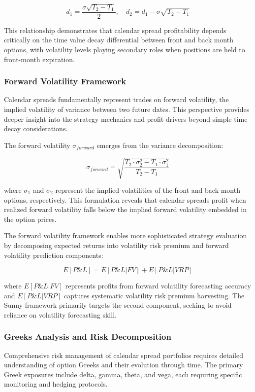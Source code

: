 \documentclass[
  american,
  11pt,
  11pt,
  letterpaper,
  onecolumn]{article}
\begin{document}
\[d_1 = \frac{\sigma\sqrt{T_2 - T_1}}{2}, \quad d_2 = d_1 - \sigma\sqrt{T_2 - T_1}\]

This relationship demonstrates that calendar spread profitability
depends critically on the time value decay differential between front
and back month options, with volatility levels playing secondary roles
when positions are held to front-month expiration.

\subsubsection{Forward Volatility
Framework}\label{forward-volatility-framework}

Calendar spreads fundamentally represent trades on forward volatility,
the implied volatility of variance between two future dates. This
perspective provides deeper insight into the strategy mechanics and
profit drivers beyond simple time decay considerations.

The forward volatility \(\sigma_{forward}\) emerges from the variance
decomposition:

\[\sigma_{forward} = \sqrt{\frac{T_2 \cdot \sigma_2^2 - T_1 \cdot \sigma_1^2}{T_2 - T_1}}\]

where \(\sigma_1\) and \(\sigma_2\) represent the implied volatilities
of the front and back month options, respectively. This formulation
reveals that calendar spreads profit when realized forward volatility
falls below the implied forward volatility embedded in the option
prices.

The forward volatility framework enables more sophisticated strategy
evaluation by decomposing expected returns into volatility risk premium
and forward volatility prediction components:

\[E[P\&L] = E[P\&L|FV] + E[P\&L|VRP]\]

where \(E[P\&L|FV]\) represents profits from forward volatility
forecasting accuracy and \(E[P\&L|VRP]\) captures systematic volatility
risk premium harvesting. The Sunny framework primarily targets the
second component, seeking to avoid reliance on volatility forecasting
skill.

\subsubsection{Greeks Analysis and Risk
Decomposition}\label{greeks-analysis-and-risk-decomposition}

Comprehensive risk management of calendar spread portfolios requires
detailed understanding of option Greeks and their evolution through
time. The primary Greek exposures include delta, gamma, theta, and vega,
each requiring specific monitoring and hedging protocols.
\end{document}
